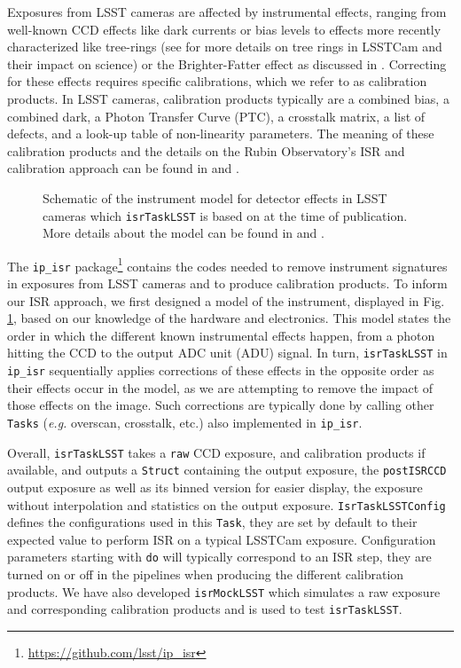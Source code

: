 Exposures from LSST cameras are affected by instrumental effects, ranging from well-known CCD effects like dark currents or bias levels to effects more recently characterized like tree-rings (see \citet{2017JInst..12C5015P,2020JATIS...6a1005P,2023PASP..135k5003E,2015JInst..10C8010O,2016ApJ...825...61O} for more details on tree rings in LSSTCam and their impact on science) or the Brighter-Fatter effect as discussed in \citet{2024PASP..136d5003B}.
Correcting for these effects requires specific calibrations, which we refer to as calibration products. In LSST cameras, calibration products typically are a combined bias, a combined dark, a Photon Transfer Curve (PTC), a crosstalk matrix, a list of defects, and a look-up table of non-linearity parameters.
The meaning of these calibration products and the details on the Rubin Observatory's ISR and calibration approach can be found in \citet{2024arXiv240414516P} and \citet{SITCOMTN-086}.
\begin{figure}
    \caption{Schematic of the instrument model for detector effects in LSST cameras which \texttt{isrTaskLSST} is based on at the time of publication. More details about the model can be found in \citet{SITCOMTN-086} and \citet{ 2024arXiv240414516P}.}
    \label{fig:isr_model}
\end{figure}

The \texttt{ip\_isr} package\footnote{\url{https://github.com/lsst/ip_isr}} contains the codes needed to remove instrument signatures in exposures from LSST cameras and to produce calibration products.
To inform our ISR approach, we first designed a model of the instrument, displayed in Fig. \ref{fig:isr_model}, based on our knowledge of the hardware and electronics.
This model states the order in which the different known instrumental effects happen, from a photon hitting the CCD to the output ADC unit (ADU) signal.
In turn, \texttt{isrTaskLSST} in \texttt{ip\_isr} sequentially applies corrections of these effects in the opposite order as their effects occur in the model, as we are attempting to remove the impact of those effects on the image. Such corrections are typically done by calling other \texttt{Tasks} (\textit{e.g.} overscan, crosstalk, etc.) also implemented in \texttt{ip\_isr}.


Overall, \texttt{isrTaskLSST} takes a \texttt{raw} CCD exposure, and calibration products if available, and outputs a \texttt{Struct} containing the output exposure, the \texttt{postISRCCD} output exposure as well as its binned version for easier display, the exposure without interpolation and statistics on the output exposure.
\texttt{IsrTaskLSSTConfig} defines the configurations used in this \texttt{Task}, they are set by default to their expected value to perform ISR on a typical LSSTCam exposure. Configuration parameters starting with \texttt{do} will typically correspond to an ISR step, they are turned on or off in the pipelines when producing the different calibration products.
We have also developed \texttt{isrMockLSST} which simulates a raw exposure and corresponding calibration products and is used to test \texttt{isrTaskLSST}.


